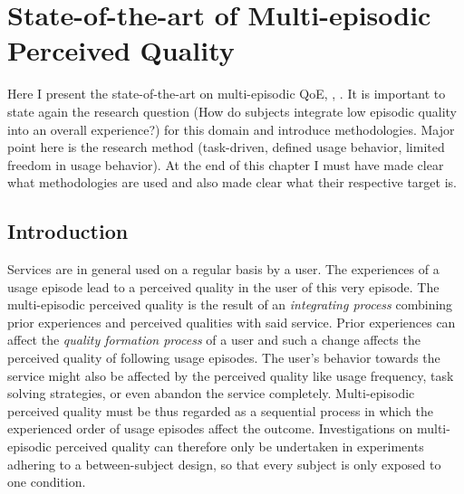 \chapter{State-of-the-art of Multi-episodic Perceived Quality}\label{chap:05}
\begin{chapter-abstract}
Here I present the state-of-the-art on multi-episodic QoE\cite{moller_single-call_2011}, \cite{duncanson_average_1969}, \cite{guse_macro-temporal_2013}.
It is important to state again the research question (How do subjects integrate low episodic quality into an overall experience?) for this domain and introduce methodologies.
Major point here is the research method (task-driven, defined usage behavior, limited freedom in usage behavior).
At the end of this chapter I must have made clear what methodologies are used and also made clear what their respective target is.
\end{chapter-abstract}

\section{Introduction}
Services are in general used on a regular basis by a user.
The experiences of a usage episode lead to a perceived quality in the user of this very episode. %
The multi-episodic perceived quality is the result of an \emph{integrating process} combining prior experiences and perceived qualities with said service.
Prior experiences can affect the \emph{quality formation process} of a user and such a change affects the perceived quality of following usage episodes.
The user's behavior towards the service might also be affected by the perceived quality like usage frequency, task solving strategies, or even abandon the service completely.
Multi-episodic perceived quality must be thus regarded as a sequential process in which the experienced order of usage episodes affect the outcome. %
Investigations on multi-episodic perceived quality can therefore only be undertaken in experiments adhering to a between-subject design, so that every subject is only exposed to one condition.


